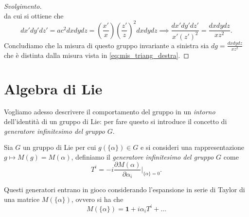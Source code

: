 \begin{example}
\begin{enumerate}[label=\protect\circled{\arabic*}]
\begin{proof}[Svolgimento]
\begin{equation}
                \end{equation}
                da cui si ottiene che
                \begin{equation}
                    dx' dy' dz' = ac^2 dxdydz = \left( \frac{x'}{x} \right) \left(\frac{z'}{z} \right)^2 dx dy dz \implies \frac{dx' dy' dz'}{x' (z')^2} = \frac{dx dy dz}{x z^2}.
                \end{equation}
                Concludiamo che la misura di questo gruppo invariante a sinistra sia $dg = \frac{dx dy dz}{x z^2}$ che è distinta dalla misura vista in \ref{eq:mis_triang_destra}.
            \end{proof}
    \end{enumerate}
\end{example}
\section{Algebra di Lie}
Vogliamo adesso descrivere il comportamento del gruppo in un \emph{intorno} dell'identità di un gruppo di Lie: per fare questo si introduce il concetto di \emph{generatore infinitesimo del gruppo $G$}.

\begin{definition}
    Sia $G$ un gruppo di Lie per cui $g(\{ \alpha \}) \in G$ e si consideri una rappresentazione $g \mapsto M(g) = M({\alpha})$, definiamo il \emph{generatore infinitesimo del gruppo $G$} come
    \begin{equation}
        T^i = -i \frac{\partial M(\alpha)}{\partial \alpha_i} \bigg|_{\{ \alpha \} = 0}.
    \end{equation}
\end{definition}

Questi generatori entrano in gioco considerando l'espansione in serie di Taylor di una matrice $M(\{ \alpha \})$, ovvero si ha che
\begin{equation}
    M(\{ \alpha \}) = \mathbf{1} + i \alpha_i T^i + \ldots
\end{equation}


